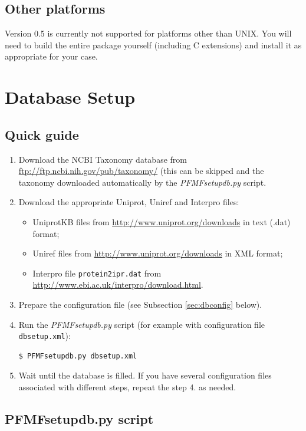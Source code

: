 \documentclass[10pt,letter]{article}
\begin{document}
\subsection{Other platforms}

Version 0.5 is currently not supported for platforms other than UNIX. You will need to build the entire package yourself (including C extensions) and install it as appropriate for your case.

\section{Database Setup}

\subsection{Quick guide}

\begin{enumerate}
\item Download the NCBI Taxonomy database from \url{ftp://ftp.ncbi.nih.gov/pub/taxonomy/} (this can be skipped and the taxonomy downloaded automatically by the {\it PFMFsetupdb.py} script.
\item Download the appropriate Uniprot, Uniref and Interpro files:
\begin{itemize}
\item UniprotKB files from \url{http://www.uniprot.org/downloads} in text (.dat) format;
\item Uniref files from \url{http://www.uniprot.org/downloads} in XML format;
\item Interpro file \texttt{protein2ipr.dat} from \url{http://www.ebi.ac.uk/interpro/download.html}.
\end{itemize}
\item Prepare the configuration file (see Subsection \ref{sec:dbconfig} below).
\item Run the {\it PFMFsetupdb.py} script (for example with configuration file \texttt{ dbsetup.xml}):
\begin{verbatim}
$ PFMFsetupdb.py dbsetup.xml
\end{verbatim}
\item Wait until the database is filled. If you have several configuration files associated with different steps, repeat the step 4. as needed.
\end{enumerate}

\subsection{PFMFsetupdb.py script}
\end{document}
